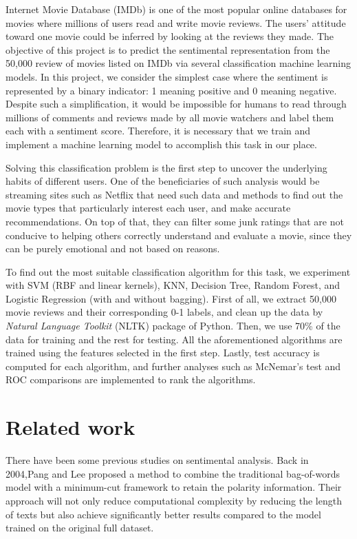\documentclass[10pt,twocolumn,letterpaper]{article}
\begin{document}
	Internet Movie Database (IMDb) is one of the most popular online databases for movies where millions of users read and write movie reviews. The users’ attitude toward one movie could be inferred by looking at the reviews they made. The objective of this project is to predict the sentimental
	representation from the 50,000 review of movies listed on IMDb\cite{maas-EtAl:2011:ACL-HLT2011} via several classification machine learning models. In this project, we consider the simplest case where the sentiment is represented by a binary indicator: 1 meaning positive and 0 meaning negative. Despite such a simplification, it would be impossible for humans to read through millions of comments and reviews made by all movie watchers and label them each with a sentiment score. Therefore, it is necessary that we train and implement a machine learning model to accomplish this task in our place. 
	
	Solving this classification problem is the first step to uncover the underlying habits of different users. One of the beneficiaries of such analysis would be streaming sites such as Netflix that need such data and methods to find out the movie types that particularly interest each user, and make accurate recommendations. On top of that, they can filter some junk ratings that are not conducive to helping others correctly understand and evaluate a movie, since they can be purely emotional and not based on reasons. 
	
	To find out the most suitable classification algorithm for this task, we experiment with SVM (RBF and linear kernels), KNN, Decision Tree, Random Forest, and Logistic Regression (with and without bagging). First of all, we extract 50,000 movie reviews and their corresponding 0-1 labels, and clean up the data by \textit{Natural Language Toolkit} (NLTK) package of Python. Then, we use 70\% of the data for training and the rest for testing. All the aforementioned algorithms are trained using the features selected in the first step. Lastly, test accuracy is computed for each algorithm, and further analyses such as McNemar's test and ROC comparisons are implemented to rank the algorithms.
	
	\section{Related work}
	There have been some previous studies on sentimental analysis. Back in 2004,Pang and Lee proposed a method to combine the traditional bag-of-words model with a minimum-cut framework to retain the polarity information\cite{DBLP:journals/corr/cs-CL-0409058}. Their approach will not only reduce computational complexity by reducing the length of texts but also achieve significantly better results compared to the model trained on the original full dataset. 
	
\end{document}
